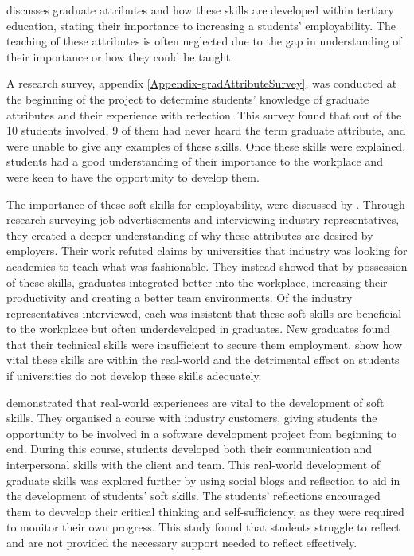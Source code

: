 \documentclass{l4proj}
\begin{document}
\citet{barr_2019} discusses graduate attributes and how these skills are developed within tertiary education, stating their importance to increasing a students’ employability. The teaching of these attributes is often neglected due to the gap in understanding of their importance or how they could be taught.

A research survey, appendix \ref{Appendix-gradAttributeSurvey}, was conducted at the beginning of the project to determine students' knowledge of graduate attributes and their experience with reflection. This survey found that out of the 10 students involved, 9 of them had never heard the term graduate attribute, and were unable to give any examples of these skills. Once these skills were explained, students had a good understanding of their importance to the workplace and were keen to have the opportunity to develop them. 

The importance of these soft skills for employability, were discussed by \citet{stevens_industry_2016}. Through research surveying job advertisements and interviewing industry representatives, they created a deeper understanding of why these attributes are desired by employers. Their work refuted claims by universities that industry was looking for academics to teach what was fashionable. They instead showed that by possession of these skills, graduates integrated better into the workplace, increasing their productivity and creating a better team environments. Of the industry representatives interviewed, each was insistent that these soft skills are beneficial to the workplace but often underdeveloped in graduates. New graduates found that their technical skills were insufficient to secure them employment. \citet{stevens_industry_2016} show how vital these skills are within the real-world and the detrimental effect on students if universities do not develop these skills adequately.

\citet{abernethy_teaching_2009} demonstrated that real-world experiences are vital to the development of soft skills. They organised a course with industry customers, giving students the opportunity to be involved in a software development project from beginning to end. During this course, students developed both their communication and interpersonal skills with the client and team. This real-world development of graduate skills was explored further by \citet{mcdermott_developing_nodate} using social blogs and reflection to aid in the development of students' soft skills. The students' reflections encouraged them to devvelop their critical thinking and self-sufficiency, as they were required to monitor their own progress. This study found that students struggle to reflect and are not provided the necessary support needed to reflect effectively. 
\end{document}
